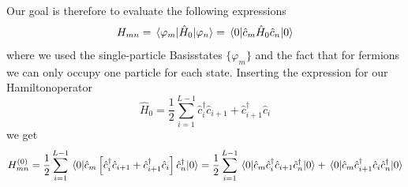 \documentclass[11pt, a4paper]{article}
\theoremstyle{definition} %
\begin{document}
	Our goal is therefore to evaluate the following expressions
	\begin{equation}
		H_{mn} = \mel{\varphi_m}{\hat{H}_0}{\varphi_n} = \mel{0}{\hat{c}_m\hat{H}_0 \hat{c}_n}{0}
	\end{equation}
	where we used the single-particle Basisstates $\{\varphi_m\}$ and the fact that for fermions we can only occupy one particle for each state.
	Inserting the expression for our Hamiltonoperator 
	\begin{equation}
		\hat{H}_0 = \frac{1}{2} \sum_{i=1}^{L-1} \hat{c}_i^\dagger \hat{c}_{i+1} + \hat{c}_{i+1}^\dagger \hat{c}_{i} 
	\end{equation}
	we get
	\begin{align}
	H_{mn}^{(0)} = \frac{1}{2}\sum_{i=1}^{L-1}\mel{0}{\hat{c}_m \left[ \hat{c}_i^\dagger \hat{c}_{i+1} + \hat{c}_{i+1}^\dagger \hat{c}_i\right]\hat{c}_n^\dagger}{0} = \frac{1}{2}\sum_{i=1}^{L-1} \mel{0}{\hat{c}_m \hat{c}_i^\dagger \hat{c}_{i+1} \hat{c}_n^\dagger}{0} + \mel{0}{\hat{c}_m \hat{c}_{i+1}^\dagger \hat{c}_i\hat{c}_n^\dagger}{0}
	\label{eq:Energy_Density_Matrix}
	\end{align}
\end{document}
